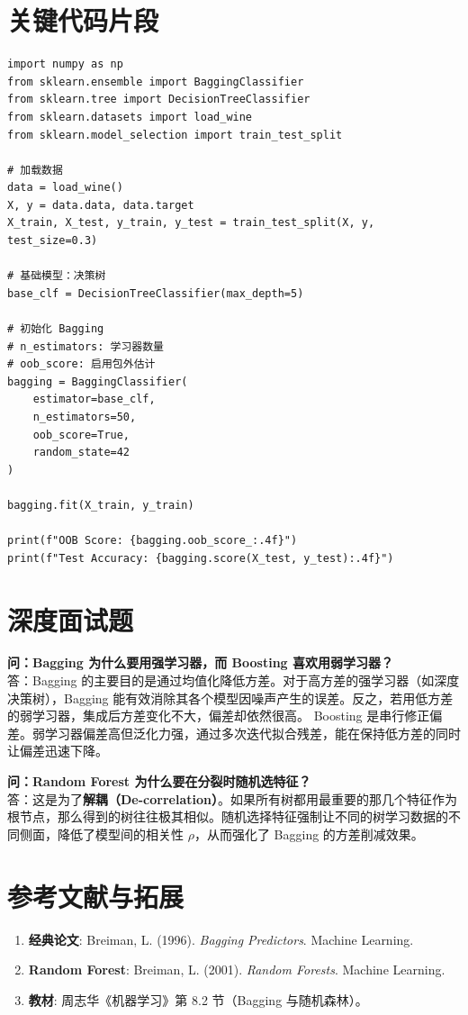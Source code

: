 \documentclass[12pt, a4paper]{book}
\begin{document}
\section{关键代码片段}
\begin{lstlisting}
import numpy as np
from sklearn.ensemble import BaggingClassifier
from sklearn.tree import DecisionTreeClassifier
from sklearn.datasets import load_wine
from sklearn.model_selection import train_test_split

# 加载数据
data = load_wine()
X, y = data.data, data.target
X_train, X_test, y_train, y_test = train_test_split(X, y, test_size=0.3)

# 基础模型：决策树
base_clf = DecisionTreeClassifier(max_depth=5)

# 初始化 Bagging 
# n_estimators: 学习器数量
# oob_score: 启用包外估计
bagging = BaggingClassifier(
    estimator=base_clf, 
    n_estimators=50, 
    oob_score=True,
    random_state=42
)

bagging.fit(X_train, y_train)

print(f"OOB Score: {bagging.oob_score_:.4f}")
print(f"Test Accuracy: {bagging.score(X_test, y_test):.4f}")
\end{lstlisting}

\section{深度面试题}

\textbf{问：Bagging 为什么要用强学习器，而 Boosting 喜欢用弱学习器？}\\
答：Bagging 的主要目的是通过均值化降低方差。对于高方差的强学习器（如深度决策树），Bagging 能有效消除其各个模型因噪声产生的误差。反之，若用低方差的弱学习器，集成后方差变化不大，偏差却依然很高。
Boosting 是串行修正偏差。弱学习器偏差高但泛化力强，通过多次迭代拟合残差，能在保持低方差的同时让偏差迅速下降。

\textbf{问：Random Forest 为什么要在分裂时随机选特征？}\\
答：这是为了\textbf{解耦（De-correlation）}。如果所有树都用最重要的那几个特征作为根节点，那么得到的树往往极其相似。随机选择特征强制让不同的树学习数据的不同侧面，降低了模型间的相关性 $\rho$，从而强化了 Bagging 的方差削减效果。

\section{参考文献与拓展}
\begin{enumerate}
    \item \textbf{经典论文}: Breiman, L. (1996). \textit{Bagging Predictors}. Machine Learning.
    \item \textbf{Random Forest}: Breiman, L. (2001). \textit{Random Forests}. Machine Learning.
    \item \textbf{教材}: 周志华《机器学习》第 8.2 节（Bagging 与随机森林）。
\end{enumerate}
\end{document}
